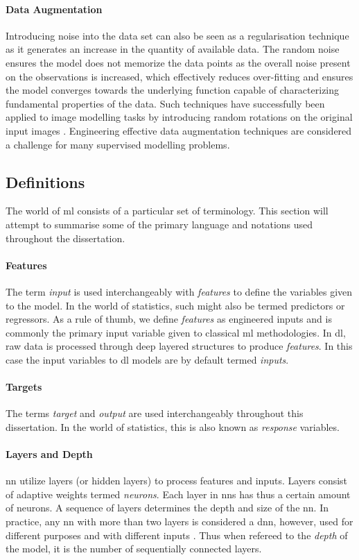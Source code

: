 \paragraph{Data Augmentation}
Introducing noise into the data set can also be seen as a regularisation technique as it generates an increase in the quantity of available data. The random noise ensures the model does not memorize the data points as the overall noise present on the observations is increased, which effectively reduces over-fitting and ensures the model converges towards the underlying function capable of characterizing fundamental properties of the data. Such techniques have successfully been applied to image modelling tasks by introducing random rotations on the original input images \cite{Shorten2019ALearning}. Engineering effective data augmentation techniques are considered a challenge for many supervised modelling problems. 

\subsection{Definitions}
The world of \gls{ml} consists of a particular set of terminology. This section will attempt to summarise some of the primary language and notations used throughout the dissertation.

\paragraph{Features}
The term \emph{input} is used interchangeably with \emph{features} to define the variables given to the model. In the world of statistics, such might also be termed predictors or regressors. As a rule of thumb, we define \emph{features} as engineered inputs and is commonly the primary input variable given to classical \gls{ml} methodologies. In \gls{dl}, raw data is processed through deep layered structures to produce \emph{features}. In this case the input variables to \gls{dl} models are by default termed \emph{inputs}. 

\paragraph{Targets}
The terms \emph{target} and \emph{output} are used interchangeably throughout this dissertation. In the world of statistics, this is also known as \emph{response} variables. 

\paragraph{Layers and Depth}
\gls{nn} utilize layers (or hidden layers) to process features and inputs. Layers consist of adaptive weights termed \emph{neurons}. Each layer in \glspl{nn} has thus a certain amount of neurons. A sequence of layers determines the depth and size of the \gls{nn}. In practice, any \gls{nn} with more than two layers is considered a \gls{dnn}, however, used for different purposes and with different inputs \cite{M.Bishop2006}. Thus when refereed to the \emph{depth} of the model, it is the number of sequentially connected layers. 

